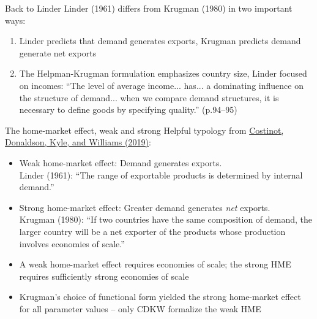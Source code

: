 \documentclass[10pt,notes=hide]{beamer}
\begin{document}
\begin{frame}{Back to Linder}
Linder (1961) differs from Krugman (1980) in two important ways:
\begin{enumerate}
	\item Linder predicts that demand generates exports, Krugman predicts demand generate net exports
	\item The Helpman-Krugman formulation emphasizes country size, Linder focused on incomes:
	``The level of average income... has... a dominating influence on the structure of demand... when we compare demand structures, it is necessary to define goods by specifying quality.'' (p.94--95)
\end{enumerate}
\end{frame}
\begin{frame}{The home-market effect, weak and strong}
Helpful typology from \href{https://academic.oup.com/qje/article/134/2/843/5298504}{Costinot, Donaldson, Kyle, and Williams (2019)}:
\begin{itemize}
	\item Weak home-market effect: Demand generates exports.\\Linder (1961): ``The range of exportable products is determined by internal demand.''
	\item Strong home-market effect: Greater demand generates \textit{net} exports.\\ Krugman (1980): ``If two countries have the same composition of demand, the larger country will be a net exporter of the products whose production involves economies of scale.''
	\item A weak home-market effect requires economies of scale; the strong HME requires sufficiently strong economies of scale
	\item Krugman's choice of functional form yielded the strong home-market effect for all parameter values -- only CDKW formalize the weak HME
\end{itemize}
\end{frame}
\end{document}
